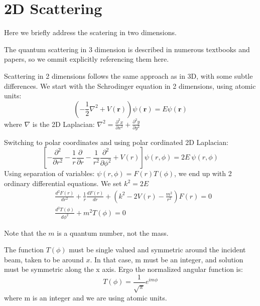 \chapter{2D Scattering}

  Here we briefly address the scatering in two dimensions.

  The quantum scattering in 3 dimension is described in numerous textbooks and papers, so we ommit explicitly referencing them here.

  Scattering in 2 dimensions follows the same approach as in 3D, with some subtle differences.
  We start with the Schrodinger equation in 2 dimensions, using atomic units:
  \begin{equation}\label{2DS1}
      \left(-\frac{1}{2}\nabla^2 + V(\mathbf{r})\right)\psi(\mathbf{r}) = E\psi(\mathbf{r})
  \end{equation}
  where $ \nabla $ is the 2D Laplacian: $ \nabla^2 = \frac{\partial^2 x}{\partial x^2} + \frac{\partial^2 y}{\partial y^2} $

  Switching to polar coordinates and using polar cordinated 2D Laplacian:
  \begin{equation}
      \left[-\frac{\partial^2}{\partial r^2} - \frac{1}{r}\frac{\partial}{\partial r} - \frac{1}{r^2}\frac{\partial^2}{\partial\phi^2} + V(r)\right]\psi(r,\phi) = 2E\ \psi(r,\phi)
  \end{equation}
  Using separation of variables: $ \psi(r,\phi) = F(r)T(\phi) $, we end up with 2 ordinary differential equations. We set $ k^2 = 2E $
  \begin{equation}
  \begin{split}
   & \frac{d^2F(r)}{d r^2} +\frac{1}{r}\frac{d F(r)}{d r} +(k^2 -  2V(r) - \frac{m^2}{r^2})F(r) = 0\\[.8em]
   & \frac{d^2 T(\phi)}{d \phi^2} + m^2 T(\phi) = 0
  \end{split}
  \end{equation}

  Note that the $ m $ is a quantum number, not the mass. 

  The function $ T(\phi) $ must be single valued and symmetric around the incident beam, taken to be around $ x $. In that case, m must be an integer, and solution must be symmetric along the x axis. Ergo the normalized angular function is:
  \begin{equation}
T(\phi) = \frac{1}{\sqrt{\pi}}e^{i m\phi}
\end{equation}
where m is an integer and we are using atomic units.

